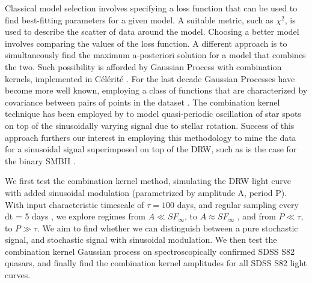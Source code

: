 \documentclass[modern]{aastex62}
\begin{document}
Classical model selection involves specifying a loss function that can be used to find best-fitting parameters for a given model. A suitable metric, such as $\chi^{2}$, is used to  describe the scatter of data around the model. Choosing a better model involves comparing the values of the loss function. A different approach is to simultaneously find the maximum a-posteriori solution for a model that combines the two. Such possibility is afforded by Gaussian Process with combination kernels,  implemented in C\'el\'erit\'e  \citep{foreman2017}. For the last decade Gaussian Processes have become more well known, employing a class of functions that  are characterized by covariance between pairs of points in the dataset \citep{foreman2017}.  The combination kernel technique has been employed by  \cite{angus2018}  to model  quasi-periodic oscillation of star spots on top of the sinusoidally varying signal due to stellar rotation. Success of this approach furthers our interest in employing this methodology to mine the data for a sinusoidal signal superimposed on top of the DRW, such as is the case for the binary SMBH \citep{charisi2018}. 

We first test the combination kernel method, simulating the DRW light curve with added sinusoidal modulation (parametrized by amplitude A, period P). With input characteristic timescale of $\tau  = 100 $ days, and regular sampling every dt = 5 days  , we explore regimes from $A \ll SF_{\infty}$,  to $A \approx SF_{\infty}$ , and from $P \ll \tau$, to $P \gg \tau$. We aim to find whether we can distinguish between a pure stochastic signal, and stochastic signal with sinusoidal modulation. We then test the combination kernel Gaussian process on spectroscopically confirmed SDSS S82 quasars, and finally find  the combination kernel amplitudes for all SDSS S82 light curves.
\end{document}
